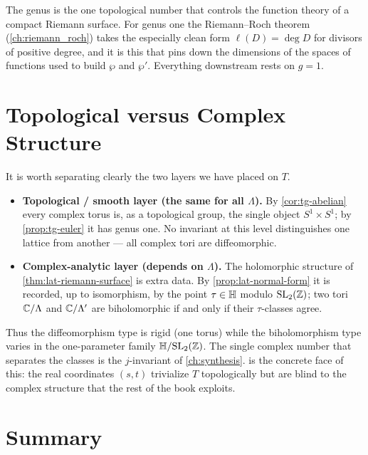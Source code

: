 \begin{remark}
\label{rem:tg-genus-matters}
The genus is the one topological number that controls the function theory of a
compact Riemann surface. For genus one the Riemann--Roch theorem
(\cref{ch:riemann_roch}) takes the especially clean form \(\ell(D) = \deg D\) for
divisors of positive degree, and it is this that pins down the dimensions of the
spaces of functions used to build \(\wp\) and \(\wp'\). Everything downstream
rests on \(g = 1\).
\end{remark}

\section{Topological versus Complex Structure}
\label{sec:tg-top-vs-complex}

It is worth separating clearly the two layers we have placed on \(T\).

\begin{itemize}
\item \textbf{Topological / smooth layer (the same for all \(\Lambda\)).} By
\cref{cor:tg-abelian} every complex torus is, as a topological group, the single
object \(S^1 \times S^1\); by \cref{prop:tg-euler} it has genus one. No invariant
at this level distinguishes one lattice from another --- all complex tori are
diffeomorphic.

\item \textbf{Complex-analytic layer (depends on \(\Lambda\)).} The holomorphic
structure of \cref{thm:lat-riemann-surface} is extra data. By
\cref{prop:lat-normal-form} it is recorded, up to isomorphism, by the point
\(\tau \in \mathbb{H}\) modulo \(\mathrm{SL}_2(\mathbb{Z})\); two tori \(\mathbb{C}/\Lambda\) and
\(\mathbb{C}/\Lambda'\) are biholomorphic if and only if their \(\tau\)-classes agree.
\end{itemize}

Thus the diffeomorphism type is rigid (one torus) while the biholomorphism type
varies in the one-parameter family \(\mathbb{H} / \mathrm{SL}_2(\mathbb{Z})\). The single
complex number that separates the classes is the \(j\)-invariant of
\cref{ch:synthesis}.  is the concrete face of this: the
real coordinates \((s,t)\) trivialize \(T\) topologically but are blind to the
complex structure that the rest of the book exploits.

\section{Summary}
\label{sec:tg-summary}

